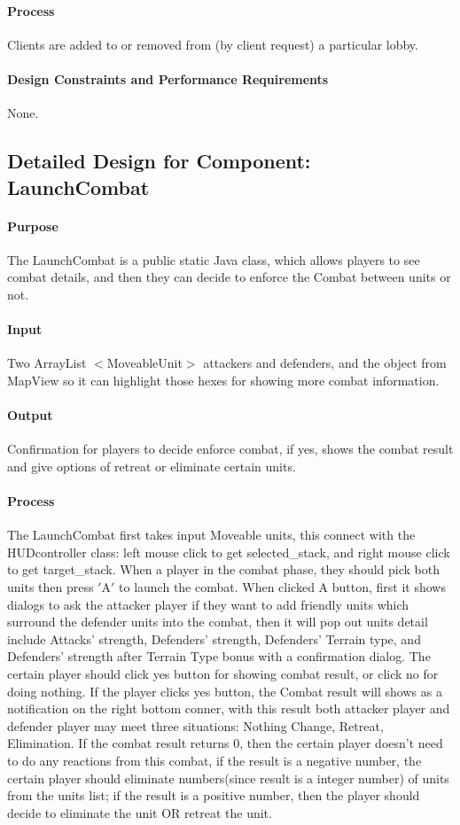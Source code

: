 \documentclass[12pt,a4paper,titlepage]{article}
\begin{document}
\paragraph{Process} Clients are added to or removed from (by client request) a particular lobby. 
\paragraph{Design Constraints and Performance Requirements} None.

\subsection{Detailed Design for Component: LaunchCombat}
\paragraph{Purpose} The LaunchCombat is a public static Java class, which allows players to see combat details, and then they can decide to enforce the Combat between units or not.
\paragraph{Input} Two ArrayList $<$MoveableUnit$>$ attackers and defenders, and the object from MapView so it can highlight those hexes for showing more combat information.
\paragraph{Output} Confirmation for players to decide enforce combat, if yes, shows the combat result and give options of retreat or eliminate certain units.
\paragraph{Process} The LaunchCombat first takes input Moveable units, this connect with the HUDcontroller class: left mouse click to get selected\_stack, and right mouse click to get target\_stack. When a player in the combat phase, they should pick both units then press $'$A$'$ to launch the combat. When clicked A button, first it shows dialogs to ask the attacker player if they want to add friendly units which surround the defender units into the combat, then it will pop out units detail include Attacks' strength, Defenders' strength, Defenders' Terrain type, and Defenders' strength after Terrain Type bonus with a confirmation dialog. The certain player should click yes button for showing combat result, or click no for doing nothing. If the player clicks yes button, the Combat result will shows as a notification on the right bottom conner, with this result both attacker player and defender player may meet three situations: Nothing Change, Retreat, Elimination. If the combat result returns 0, then the certain player doesn't need to do any reactions from this combat, if the result is a negative number, the certain player should eliminate numbers(since result is a integer number) of units from the units list; if the result is a positive number, then the player should decide to eliminate the unit OR retreat the unit.
\end{document}
